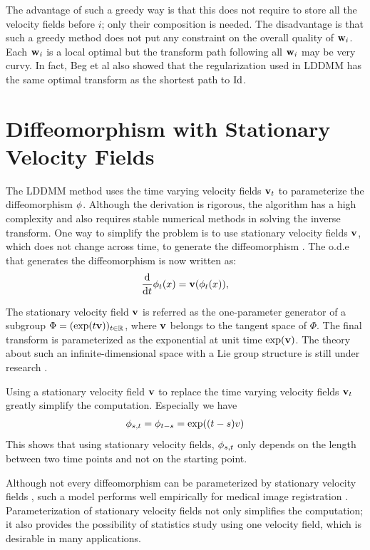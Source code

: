 \documentclass[letterpaper,12pt]{article}
\begin{document}
The advantage of such a greedy way is that this does not require to store all the velocity fields before $i$; only their composition is needed. The disadvantage is that such a greedy method does not put any constraint on the overall quality of $\mathbf{w}_i$. Each $\mathbf{w}_i$ is a local optimal but the transform path following all $\mathbf{w}_i$ may be very curvy. In fact, Beg et al also \cite{Beg2005Computing} showed that the regularization used in LDDMM has the same optimal transform as the shortest path to $\text{Id}$.


\section{Diffeomorphism with Stationary Velocity Fields}

The LDDMM method \cite{Beg2005Computing} uses the time varying
velocity fields $\mathbf{v}_t$ to parameterize the diffeomorphism
$\phi$. Although the derivation is rigorous, the algorithm has a high complexity and also requires stable numerical methods in solving the inverse transform. One way to simplify the problem is to use stationary velocity fields $\mathbf{v}$, which does not change across time, to generate the diffeomorphism \cite{Arsigny2006,Ashburner2007,Vercauteren2007,Vercauteren2008Symmetric,Hernandez2009}. The o.d.e that generates the diffeomorphism is now written as:
\begin{align}
\frac{\text{d}}{\text{d} t} \phi_t(x) = \mathbf{v}(\phi_t(x)), 
\end{align}

The stationary velocity field $\mathbf{v}$ is referred as the one-parameter generator of a subgroup $\Phi=(\exp(t\mathbf{v}))_{t \in \mathbb{R}}$, where $\mathbf{v}$ belongs to the tangent space of $\Phi$. The final transform is parameterized as the exponential at unit time $\exp(\mathbf{v})$. The theory about such an infinite-dimensional space with a Lie group structure is still under research \cite{Arsigny2006, Vercauteren2008Symmetric, Sternberg1964, Mahony2002}.  

Using a stationary velocity field $\mathbf{v}$ to replace the time varying velocity fields $\mathbf{v}_t$ greatly simplify the computation. Especially we have
\begin{align}
\phi_{s,t} = \phi_{t-s} = \exp((t-s)v)
\end{align}
This shows that using stationary velocity fields, $\phi_{s,t}$ only depends on the length between two time points and not on the starting point. 

Although not every diffeomorphism can be parameterized by stationary velocity fields \cite{Ashburner2007}, such a model performs well empirically for medical image registration \cite{Hernandez2009, Vercauteren2009}. Parameterization of stationary velocity fields not only simplifies the computation; it also provides the possibility of statistics study using one velocity field, which is desirable in many applications.
\end{document}
